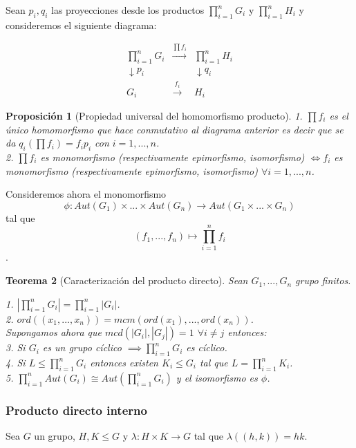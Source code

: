 \documentclass{article}
\theoremstyle{theorem-style}  %
\newtheorem{theorem}{Teorema}[section]  %
\newtheorem{proposition}[theorem]{Proposición}
\theoremstyle{definition-style}
\theoremstyle{example-style}
\begin{document}
Sean $p_i,q_i$ las proyecciones desde los productos $\prod_{i=1}^{n} G_i$ y $\prod_{i=1}^{n} H_i$ y consideremos el siguiente diagrama:

$$
\begin{matrix}
\prod_{i=1}^{n} G_i&\stackrel{\prod f_i}{\longrightarrow}&\prod_{i=1}^{n} H_i\\
\downarrow{p_i}&&\downarrow{q_i}\\
G_i&\stackrel{f_i}{\longrightarrow}&H_i
\end{matrix}
$$

\begin{proposition}[Propiedad universal del homomorfismo producto]
1. $\prod f_i$ es el único homomorfismo que hace conmutativo al diagrama anterior es decir que se da $q_i(\prod f_i) = f_i p_i$ con $i=1,...,n$.\\
2. $\prod f_i$ es monomorfismo (respectivamente epimorfismo, isomorfismo) $\iff f_i$ es monomorfismo (respectivamente epimorfismo, isomorfismo) $\forall i=1,...,n$.
\end{proposition}

Consideremos ahora el monomorfismo $$\phi:Aut(G_1) \times ... \times Aut(G_n) \rightarrow Aut(G_1 \times ... \times G_n)$$ tal que $$(f_1,...,f_n) \mapsto \prod_{i=1}^{n} f_i$$.

\begin{theorem}[Caracterización del producto directo]
Sean $G_1,...,G_n$ grupo finitos.

1. $|\prod_{i=1}^{n} G_i| = \prod_{i=1}^{n} |G_i|$.\\
2. $ord((x_1,...,x_n)) = mcm(ord(x_1),...,ord(x_n))$.\\
Supongamos ahora que $mcd(|G_i|,|G_j|) = 1$ $\forall i \neq j$ entonces:\\
3. Si $G_i$ es un grupo cíclico $\implies \prod_{i=1}^{n} G_i$ es cíclico.\\
4. Si $L \le \prod_{i=1}^{n} G_i$ entonces existen $K_i \le G_i$ tal que $L = \prod_{i=1}^{n} K_i$.\\
5. $\prod_{i=1}^{n} Aut(G_i) \cong Aut(\prod_{i=1}^{n} G_i)$ y el isomorfismo es $\phi$.
\end{theorem}

\subsubsection{Producto directo interno}

Sea $G$ un grupo, $H,K \le G$ y $\lambda:H \times K \rightarrow G$ tal que $\lambda((h,k)) = hk$.
\end{document}
